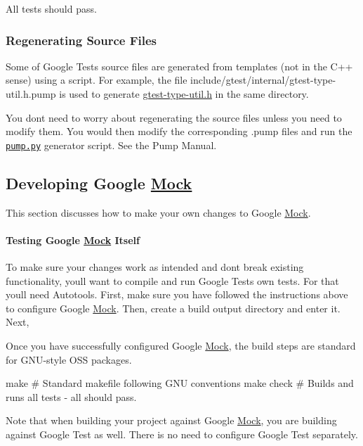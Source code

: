 All tests should pass.

\subsubsection*{Regenerating Source Files}

Some of Google Test\textquotesingle{}s source files are generated from templates (not in the C++ sense) using a script. For example, the file include/gtest/internal/gtest-\/type-\/util.\+h.\+pump is used to generate \hyperlink{gtest-type-util_8h_source}{gtest-\/type-\/util.\+h} in the same directory.

You don\textquotesingle{}t need to worry about regenerating the source files unless you need to modify them. You would then modify the corresponding {\ttfamily .pump} files and run the \textquotesingle{}\href{googletest/scripts/pump.py}{\tt pump.\+py}\textquotesingle{} generator script. See the Pump Manual.

\subsection*{Developing Google \hyperlink{classMock}{Mock}}

This section discusses how to make your own changes to Google \hyperlink{classMock}{Mock}.

\paragraph*{Testing Google \hyperlink{classMock}{Mock} Itself}

To make sure your changes work as intended and don\textquotesingle{}t break existing functionality, you\textquotesingle{}ll want to compile and run Google Test\textquotesingle{}s own tests. For that you\textquotesingle{}ll need Autotools. First, make sure you have followed the instructions above to configure Google \hyperlink{classMock}{Mock}. Then, create a build output directory and enter it. Next, 


Once you have successfully configured Google \hyperlink{classMock}{Mock}, the build steps are standard for G\+N\+U-\/style O\+SS packages. \begin{DoxyVerb}make        # Standard makefile following GNU conventions
make check  # Builds and runs all tests - all should pass.
\end{DoxyVerb}


Note that when building your project against Google \hyperlink{classMock}{Mock}, you are building against Google Test as well. There is no need to configure Google Test separately. 